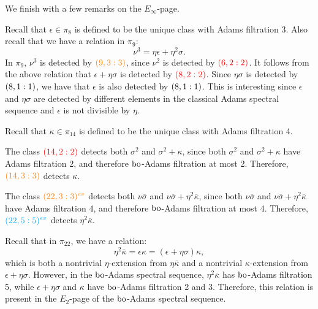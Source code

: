 We finish with a few remarks on the $E_\infty$-page.

\begin{rmk}[Stems 8-9]
Recall that $\epsilon \in \pi_8$ is defined to be the unique class with Adams filtration 3. Also recall that we have a relation in $\pi_9$: 
$$\nu^3 = \eta \epsilon + \eta^2\sigma.$$
In $\pi_9$, $\nu^3$ is detected by $\gdr{9}{3}{3}{orange}$, since $\nu^2$ is detected by $\gdr{6}{2}{2}{red}$. It follows from the above relation that $\epsilon + \eta\sigma$ is detected by $\gdr{8}{2}{2}{red}$. Since $\eta\sigma$ is detected by $\gdr{8}{1}{1}{black}$, we have that $\epsilon$ is also detected by $\gdr{8}{1}{1}{black}$. This is interesting since $\epsilon$ and $\eta\sigma$ are detected by different elements in the classical Adams spectral sequence and $\epsilon$ is not divisible by $\eta$.
\end{rmk}


\begin{rmk}[Stem 14]
Recall that $\kappa \in \pi_{14}$ is defined to be the unique class with Adams filtration 4. 

The class $\gdr{14}{2}{2}{red}$ detects both $\sigma^2$ and $\sigma^2+\kappa$, since both $\sigma^2$ and $\sigma^2+\kappa$ have Adams filtration 2, and therefore $\bo$-Adams filtration at most 2. Therefore, $\gdr{14}{3}{3}{orange}$ detects $\kappa$.
\end{rmk}


\begin{rmk}[Stem 22]
The class $\evr{22}{3}{orange}$ detects both $\nu\overline{\sigma}$ and $\nu\overline{\sigma}+\eta^2\overline{\kappa}$, since both $\nu\overline{\sigma}$ and $\nu\overline{\sigma}+\eta^2\overline{\kappa}$ have Adams filtration 4, and therefore $\bo$-Adams filtration at most 4. Therefore, $\evr{22}{5}{cyan}$ detects $\eta^2\overline{\kappa}$.

Recall that in $\pi_{22}$, we have a relation:
$$\eta^2\overline{\kappa} = \epsilon \kappa = (\epsilon + \eta\sigma) \kappa,$$
which is both a nontrivial $\eta$-extension from $\eta\overline{\kappa}$ and a nontrivial $\kappa$-extension from $\epsilon + \eta\sigma$. However, in the $\bo$-Adams spectral sequence, $\eta^2\overline{\kappa}$ has $\bo$-Adams filtration 5, while $\epsilon + \eta\sigma$ and $\kappa$ have $\bo$-Adams filtration 2 and 3. Therefore, this relation is present in the $E_2$-page of the $\bo$-Adams spectral sequence.
\end{rmk}

